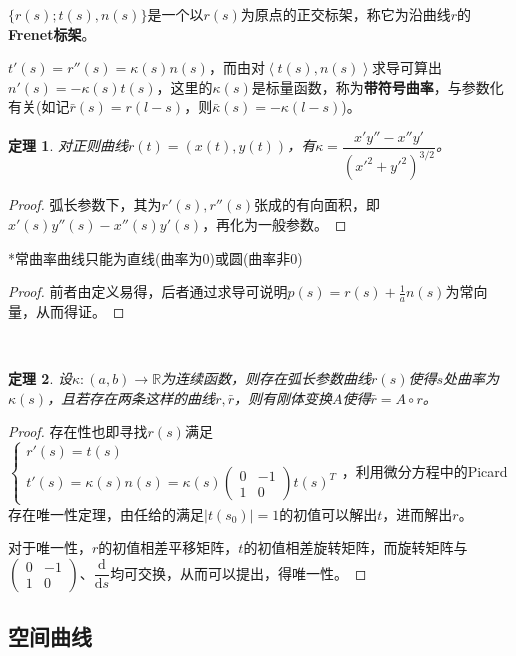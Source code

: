 \documentclass[a4paper,UTF8,fontset=windows]{ctexart}
\newtheorem{thm}{定理}[section]
\begin{document}
$\{r(s);t(s),n(s)\}$是一个以$r(s)$为原点的正交标架，称它为沿曲线$r$的\textbf{Frenet标架}。

$t'(s)=r''(s)=\kappa(s)n(s)$，而由对$\left<t(s),n(s)\right>$求导可算出$n'(s)=-\kappa(s)t(s)$，这里的$\kappa(s)$是标量函数，称为\textbf{带符号曲率}，与参数化有关(如记$\bar{r}(s)=r(l-s)$，则$\bar{\kappa}(s)=-\kappa(l-s)$)。

\begin{thm}
对正则曲线$r(t)=(x(t),y(t))$，有$\kappa=\dfrac{x'y''-x''y'}{(x'^2+y'^2)^{3/2}}$。
\end{thm}

\begin{proof}
弧长参数下，其为$r'(s),r''(s)$张成的有向面积，即$x'(s)y''(s)-x''(s)y'(s)$，再化为一般参数。
\end{proof}

*常曲率曲线只能为直线(曲率为0)或圆(曲率非0)

\begin{proof}
前者由定义易得，后者通过求导可说明$p(s)=r(s)+\frac{1}{a}n(s)$为常向量，从而得证。
\end{proof}

\

\begin{thm}
设$\kappa:(a,b)\to\mathbb{R}$为连续函数，则存在弧长参数曲线$r(s)$使得$s$处曲率为$\kappa(s)$，且若存在两条这样的曲线$r,\bar{r}$，则有刚体变换$A$使得$\bar{r}=A\circ r$。
\end{thm}

\begin{proof}
存在性也即寻找$r(s)$满足$\begin{cases}r'(s)=t(s)\\t'(s)=\kappa(s)n(s)=\kappa(s)\begin{pmatrix}0&-1\\1&0\end{pmatrix}t(s)^T\end{cases}$，利用微分方程中的Picard存在唯一性定理，由任给的满足$|t(s_0)|=1$的初值可以解出$t$，进而解出$r$。

对于唯一性，$r$的初值相差平移矩阵，$t$的初值相差旋转矩阵，而旋转矩阵与$\begin{pmatrix}0&-1\\1&0\end{pmatrix}$、$\dfrac{\mathrm{d}}{\mathrm{d}s}$均可交换，从而可以提出，得唯一性。
\end{proof}

\subsection{空间曲线}
\end{document}
